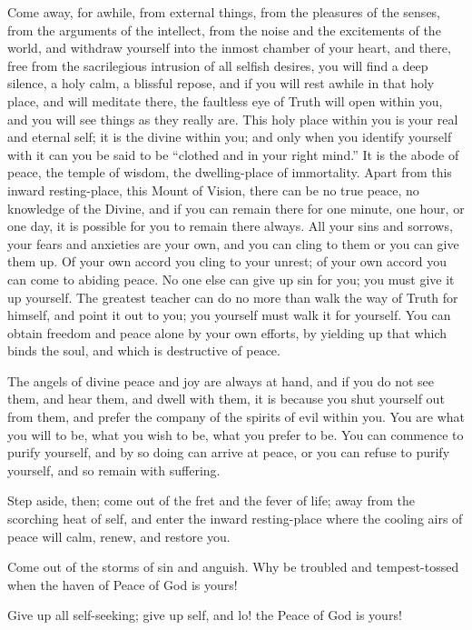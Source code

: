 \documentclass[12pt,oneside]{scrbook}
\begin{document}
  Come away, for awhile, from external things, from the pleasures of the
  senses, from the arguments of the intellect, from the noise and the
  excitements of the world, and withdraw yourself into the inmost chamber
  of your heart, and there, free from the sacrilegious intrusion of all
  selfish desires, you will find a deep silence, a holy calm, a blissful
  repose, and if you will rest awhile in that holy place, and will
  meditate there, the faultless eye of Truth will open within you, and you
  will see things as they really are. This holy place within you is your
  real and eternal self; it is the divine within you; and only when you
  identify yourself with it can you be said to be ``clothed and in your
  right mind.'' It is the abode of peace, the temple of wisdom, the
  dwelling-place of immortality. Apart from this inward resting-place,
  this Mount of Vision, there can be no true peace, no knowledge of the
  Divine, and if you can remain there for one minute, one hour, or one
  day, it is possible for you to remain there always. All your sins and
  sorrows, your fears and anxieties are your own, and you can cling to
  them or you can give them up. Of your own accord you cling to your
  unrest; of your own accord you can come to abiding peace. No one else
  can give up sin for you; you must give it up yourself. The greatest
  teacher can do no more than walk the way of Truth for himself, and point
  it out to you; you yourself must walk it for yourself. You can obtain
  freedom and peace alone by your own efforts, by yielding up that which
  binds the soul, and which is destructive of peace.
  
  The angels of divine peace and joy are always at hand, and if you do not
  see them, and hear them, and dwell with them, it is because you shut
  yourself out from them, and prefer the company of the spirits of evil
  within you. You are what you will to be, what you wish to be, what you
  prefer to be. You can commence to purify yourself, and by so doing can
  arrive at peace, or you can refuse to purify yourself, and so remain
  with suffering.
  
  Step aside, then; come out of the fret and the fever of life; away from
  the scorching heat of self, and enter the inward resting-place where the
  cooling airs of peace will calm, renew, and restore you.
  
  Come out of the storms of sin and anguish. Why be troubled and
  tempest-tossed when the haven of Peace of God is yours!
  
  Give up all self-seeking; give up self, and lo! the Peace of God is
  yours!
  
\end{document}
